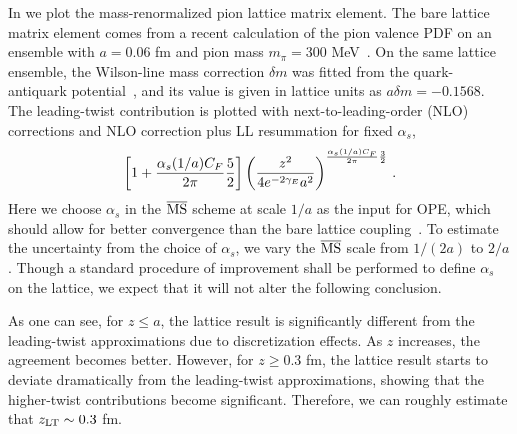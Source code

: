 In  we plot the mass-renormalized pion lattice matrix element. The bare lattice matrix element comes from a recent calculation of the pion valence PDF on an ensemble with $a=0.06$ fm and pion mass $m_\pi=300$ MeV~\cite{Gao:2020ito}. On the same lattice ensemble, the Wilson-line mass correction $\delta m$ was fitted from the quark-antiquark potential~\cite{Izubuchi:2019lyk}, and its value is given in lattice units as $a \delta m = -0.1568$. The leading-twist contribution is plotted with next-to-leading-order (NLO) corrections and NLO correction plus LL resummation for fixed $\alpha_s$,
\begin{align}
	\left[ 1 + {\alpha_s(1/a)C_F\over 2\pi}  {5\over2}\right]\left({z^2\over 4e^{-2\gamma_E}a^2}\right)^{{\alpha_s(1/a)C_F\over 2\pi}{3\over 2}}\,.
\end{align}
Here we choose $\alpha_s$ in the ${\overline{\rm MS}}$ scheme at scale $1/a$ as the input for OPE, which should allow for better convergence than the bare lattice coupling~\cite{Lepage:1992xa}. To estimate the uncertainty from the choice of $\alpha_s$, we vary the ${\overline{\rm MS}}$ scale from $1/(2a)$ to $2/a$. Though a standard procedure of improvement shall be performed to define $\alpha_s$ on the lattice, we expect that it will not alter the following conclusion.

As one can see, for $z\le a$, the lattice result is significantly different from the leading-twist approximations due to discretization effects. As $z$ increases, the agreement becomes better. However, for $z\ge 0.3$ fm, the lattice result starts to deviate dramatically from the leading-twist approximations, showing that the higher-twist contributions become significant. Therefore, we can roughly estimate that $z_{\rm LT}\sim 0.3$ fm.

